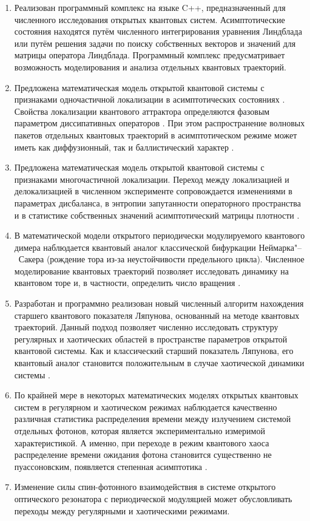 {}
\begin{enumerate}[beginpenalty=10000] %
	\item 
	Реализован программный комплекс на языке C++, предназначенный для численного исследования открытых квантовых систем. Асимптотические состояния находятся путём численного интегрирования уравнения Линдблада или путём решения задачи по поиску собственных векторов и значений для матрицы оператора Линдблада. Программный комплекс предусматривает возможность моделирования и анализа отдельных квантовых траекторий.
	\item 
	Предложена математическая модель открытой квантовой системы с признаками одночастичной локализации в асимптотических состояниях \cite{Yusipov2017}. Свойства локализации квантового аттрактора определяются фазовым параметром диссипативных операторов \cite{Vershinina2017}. При этом распространение волновых пакетов отдельных квантовых траекторий в асимптотическом режиме может иметь как диффузионный, так и баллистический характер \cite{Yusipov2018}.
	\item 
	Предложена математическая модель открытой квантовой системы с признаками  многочастичной локализации. Переход между локализацией и делокализацией в численном эксперименте сопровождается изменениями в параметрах дисбаланса, в энтропии запутанности операторного пространства и в статистике собственных значений асимптотический матрицы плотности \cite{Vakulchyk2018}.
	\item 
	В математической модели открытого периодически модулируемого квантового димера наблюдается квантовый аналог классической бифуркации Неймарка"--~Сакера (рождение тора из-за неустойчивости предельного цикла). Численное моделирование квантовых траекторий позволяет исследовать динамику на квантовом торе и, в частности, определить число вращения \cite{Yusipov2019_1}.
	\item 
	Разработан и программно реализован \cite{prog1} новый численный алгоритм нахождения старшего квантового показателя Ляпунова, основанный на методе квантовых траекторий. Данный подход позволяет численно исследовать структуру регулярных и хаотических областей в пространстве параметров открытой квантовой системы. Как и классический старший показатель Ляпунова, его квантовый аналог становится положительным в случае хаотической динамики системы \cite{Yusipov2019_2}.
	\item 
	По крайней мере в некоторых математических моделях открытых квантовых систем в регулярном и хаотическом режимах наблюдается качественно различная статистика распределения времени между излучением системой отдельных фотонов, которая является экспериментально измеримой характеристикой. А именно, при переходе в режим квантового хаоса распределение времени ожидания фотона становится существенно не пуассоновским, появляется степенная асимптотика \cite{Yusipov2020}.
	\item
	Изменение силы спин-фотонного взаимодействия в системе открытого оптического резонатора с периодической модуляцией может обусловливать переходы между регулярными и хаотическими режимами\cite{Yusipov2021}.
\end{enumerate}


